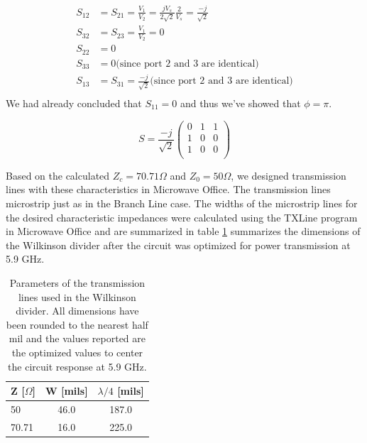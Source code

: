 \documentclass[twocolumn, aps, apl]{revtex4-1}
\begin{document}
\begin{align*}
    S_{12} &= S_{21} = \frac{V_1}{V_2} = \frac{j V_s}{2 \sqrt{2}} \frac{2}{V_s} = \frac{-j}{\sqrt{2}} \\ 
    S_{32} &= S_{23} = \frac{V_1}{V_2} = 0 \\
    S_{22} &= 0 \\
    S_{33} &= 0 \textrm{(since port 2 and 3 are identical)}\\ 
    S_{13} &= S_{31} = \frac{-j}{\sqrt{2}} \textrm{(since port 2 and 3 are identical)}\\ 
\end{align*}
We had already concluded that $S_{11} = 0$ and thus we've showed that $\phi = \pi$.

\begin{equation}
S = \frac{-j}{\sqrt{2}}
\begin{pmatrix}
    0 & 1 & 1 \\
    1 & 0 & 0 \\
    1 & 0 & 0 \\
\end{pmatrix}
\end{equation}

Based on the calculated $Z_c = 70.71 \Omega$ and $Z_0 = 50 \Omega$, we designed transmission lines with these characteristics in Microwave Office. The transmission lines microstrip just as in the Branch Line case. The widths of the microstrip lines for the desired characteristic impedances were calculated using the TXLine program in Microwave Office and are summarized in table \ref{tab:wilkinson} summarizes the dimensions of the Wilkinson divider after the circuit was optimized for power transmission at 5.9 GHz. 

\begin{table}
\centering
\begin{tabular}{l | c | c}
    \hline
    Z [$\Omega$] & W [mils] & $\lambda/4$ [mils] \\
    \hline
    50  & 46.0 & 187.0 \\
    70.71 & 16.0 & 225.0 \\
    \hline
\end{tabular}
\caption{Parameters of the transmission lines used in the Wilkinson divider. All dimensions have been rounded to the nearest half mil and the values reported are the optimized values to center the circuit response at 5.9 GHz. }
\label{tab:wilkinson}

\end{table}
\end{document}
